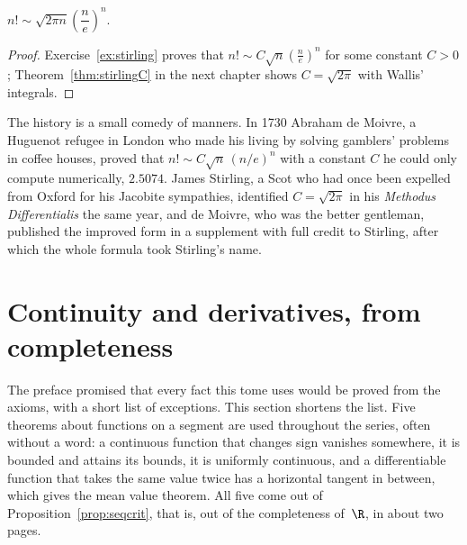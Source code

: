 \begin{theorem}[Stirling]\label{thm:stirling}
$n!\sim\sqrt{2\pi n}\left(\dfrac ne\right)^n$.
\end{theorem}
\begin{proof}
Exercise~\ref{ex:stirling} proves that $n!\sim C\sqrt n\left(\frac ne\right)^n$ for some constant $C>0$; Theorem~\ref{thm:stirlingC} in the next chapter shows $C=\sqrt{2\pi}$ with Wallis' integrals.
\end{proof}

The history is a small comedy of manners. In 1730 Abraham de Moivre, a Huguenot refugee in London who made his living by solving gamblers'
problems in coffee houses, proved that $n!\sim C\sqrt n\,(n/e)^n$ with a constant $C$ he could only compute numerically, $2.5074$. James Stirling, a
Scot who had once been expelled from Oxford for his Jacobite sympathies, identified $C=\sqrt{2\pi}$ in his \emph{Methodus Differentialis} the same year, and de Moivre,
who was the better gentleman, published the improved form in a supplement with full credit to Stirling, after which the whole formula took Stirling's name.

\section{Continuity and derivatives, from completeness}

The preface promised that every fact this tome uses would be proved from the axioms, with a short list of exceptions. This section shortens the
list. Five theorems about functions on a segment are used throughout the series, often without a word: a continuous function that changes sign
vanishes somewhere, it is bounded and attains its bounds, it is uniformly continuous, and a differentiable function that takes the same value twice
has a horizontal tangent in between, which gives the mean value theorem. All five come out of Proposition~\ref{prop:seqcrit}, that is, out of the
completeness of~$\R$, in about two pages.

